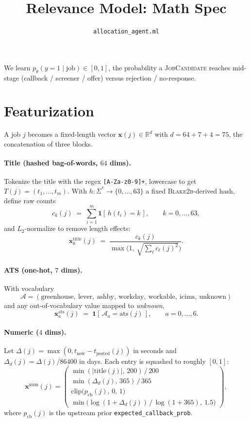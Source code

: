 \documentclass[11pt]{article}
\title{Relevance Model: Math Spec}
\author{\texttt{allocation\_agent.ml}}
\date{}
\newcommand{\R}{\mathbb{R}}
\newcommand{\Ind}{\mathbf{1}}
\begin{document}
\maketitle

\noindent We learn $p_\theta(y=1 \mid \text{job}) \in [0,1]$, the probability a
\textsc{JobCandidate} reaches mid-stage (callback / screener / offer) versus
rejection / no-response.

\section{Featurization}
A job $j$ becomes a fixed-length vector $\bm{x}(j) \in \R^{d}$ with
$d = 64 + 7 + 4 = 75$, the concatenation of three blocks.

\paragraph{Title (hashed bag-of-words, $64$ dims).}
Tokenize the title with the regex \verb|[A-Za-z0-9]+|, lowercase to get
$T(j) = (t_1, \dots, t_m)$. With $h: \Sigma^* \to \{0,\dots,63\}$ a fixed
\textsc{Blake2b}-derived hash, define raw counts
\[
  c_k(j) \;=\; \sum_{i=1}^{m} \Ind\!\left[\, h(t_i) = k \,\right],
  \qquad k = 0, \dots, 63,
\]
and $L_2$-normalize to remove length effects:
\[
  \bm{x}^{\text{title}}_k(j)
    \;=\; \frac{c_k(j)}{\max\!\Big(1,\ \sqrt{\sum_{\ell} c_\ell(j)^2}\Big)}.
\]

\paragraph{ATS (one-hot, $7$ dims).}
With vocabulary
\[
  \mathcal{A} = (\text{greenhouse},\ \text{lever},\ \text{ashby},\ \text{workday},\
                  \text{workable},\ \text{icims},\ \text{unknown})
\]
and any out-of-vocabulary value mapped to \emph{unknown},
\[
  \bm{x}^{\text{ats}}_a(j) \;=\; \Ind\!\left[\,\mathcal{A}_a = \text{ats}(j)\,\right],
  \qquad a = 0, \dots, 6.
\]

\paragraph{Numeric ($4$ dims).}
Let $\Delta(j) = \max(0, t_{\text{now}} - t_{\text{posted}}(j))$ in seconds and
$\Delta_d(j) = \Delta(j)/86400$ in days. Each entry is squashed to roughly
$[0,1]$:
\[
  \bm{x}^{\text{num}}(j) =
    \begin{pmatrix}
      \min(|\text{title}(j)|,\, 200)\,/\,200 \\[2pt]
      \min(\Delta_d(j),\, 365)\,/\,365 \\[2pt]
      \mathrm{clip}\!\big(p_{\text{cb}}(j),\,0,\,1\big) \\[2pt]
      \min\!\big(\log(1+\Delta_d(j))\,/\,\log(1+365),\ 1.5\big)
    \end{pmatrix},
\]
where $p_{\text{cb}}(j)$ is the upstream prior \verb|expected_callback_prob|.
\end{document}
